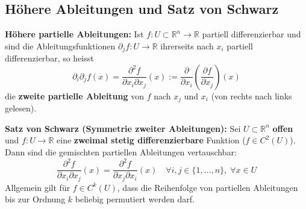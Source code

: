 \subsection{Höhere Ableitungen und Satz von Schwarz}

\begin{definition}
    \textbf{Höhere partielle Ableitungen:} Ist $f: U \subset \mathbb{R}^n \to \mathbb{R}$ partiell differenzierbar und sind die Ableitungsfunktionen $\partial_j f: U \to \mathbb{R}$ ihrerseits nach $x_i$ partiell differenzierbar, so heisst
    $$ \partial_i \partial_j f(x) = \frac{\partial^2 f}{\partial x_i \partial x_j}(x) := \frac{\partial}{\partial x_i} \left( \frac{\partial f}{\partial x_j} \right)(x) $$
    die \textbf{zweite partielle Ableitung} von $f$ nach $x_j$ und $x_i$ (von rechts nach links gelesen).
\end{definition}

\begin{theorem}
    \textbf{Satz von Schwarz (Symmetrie zweiter Ableitungen):}
    Sei $U \subset \mathbb{R}^n$ \textbf{offen} und $f: U \to \mathbb{R}$ eine \textbf{zweimal stetig differenzierbare} Funktion ($f \in C^2(U)$).
    Dann sind die gemischten partiellen Ableitungen vertauschbar:
    $$ \frac{\partial^2 f}{\partial x_i \partial x_j}(x) = \frac{\partial^2 f}{\partial x_j \partial x_i}(x) \quad \forall i, j \in \{1, \dots, n\}, \; \forall x \in U $$
    Allgemein gilt für $f \in C^k(U)$, dass die Reihenfolge von partiellen Ableitungen bis zur Ordnung $k$ beliebig permutiert werden darf.
\end{theorem}

